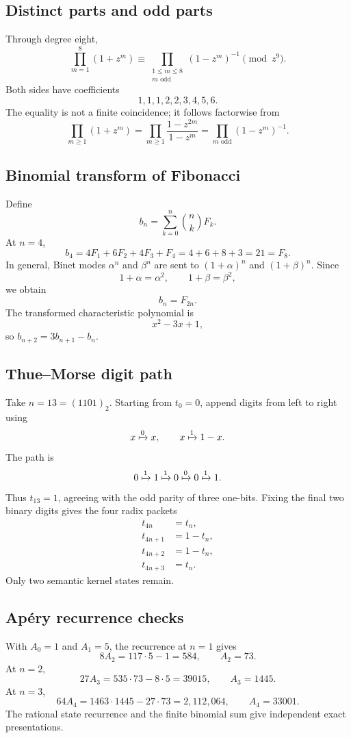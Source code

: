 \documentclass[11pt]{article}
\theoremstyle{definition}\newtheorem{definition}[theorem]{Definition}\newtheorem{example}[theorem]{Example}\newtheorem{construction}[theorem]{Construction}\newtheorem{algorithm}[theorem]{Algorithm}\newtheorem{conjecture}[theorem]{Conjecture}\newtheorem{problem}[theorem]{Problem}
\theoremstyle{remark}\newtheorem{remark}[theorem]{Remark}\newtheorem{boundary}[theorem]{Boundary}\newtheorem{certificate}[theorem]{Computational Certificate}\newtheorem{classical}[theorem]{Classical Input}\newtheorem{principle}[theorem]{Structural Principle}
\begin{document}
\subsection{Distinct parts and odd parts}
Through degree eight,
\[
 \prod_{m=1}^{8}(1+z^m)
 \equiv
 \prod_{\substack{1\leq m\leq8\\m\text{ odd}}}(1-z^m)^{-1}
 \pmod{z^9}.
\]
Both sides have coefficients
\[
 1,1,1,2,2,3,4,5,6.
\]
The equality is not a finite coincidence; it follows factorwise from
\[
 \prod_{m\geq1}(1+z^m)
 =\prod_{m\geq1}\frac{1-z^{2m}}{1-z^m}
 =\prod_{m\text{ odd}}(1-z^m)^{-1}.
\]

\subsection{Binomial transform of Fibonacci}
Define
\[
 b_n=\sum_{k=0}^{n}\binom nkF_k.
\]
At $n=4$,
\[
 b_4=4F_1+6F_2+4F_3+F_4
 =4+6+8+3=21=F_8.
\]
In general, Binet modes $\alpha^n$ and $\beta^n$ are sent to $(1+\alpha)^n$ and $(1+\beta)^n$.  Since
\[
 1+\alpha=\alpha^2,
 \qquad
 1+\beta=\beta^2,
\]
we obtain
\[
 \boxed{b_n=F_{2n}.}
\]
The transformed characteristic polynomial is
\[
 x^2-3x+1,
\]
so $b_{n+2}=3b_{n+1}-b_n$.

\subsection{Thue--Morse digit path}
Take $n=13=(1101)_2$.  Starting from $t_0=0$, append digits from left to right using
\[
 x\xmapsto{0}x,
 \qquad
 x\xmapsto{1}1-x.
\]
The path is
\[
 0\xmapsto{1}1\xmapsto{1}0\xmapsto{0}0\xmapsto{1}1.
\]
Thus $t_{13}=1$, agreeing with the odd parity of three one-bits.  Fixing the final two binary digits gives the four radix packets
\[
\begin{aligned}
 t_{4n}&=t_n,\\
 t_{4n+1}&=1-t_n,\\
 t_{4n+2}&=1-t_n,\\
 t_{4n+3}&=t_n.
\end{aligned}
\]
Only two semantic kernel states remain.

\subsection{Ap\'ery recurrence checks}
With $A_0=1$ and $A_1=5$, the recurrence at $n=1$ gives
\[
 8A_2=117\cdot5-1=584,
 \qquad A_2=73.
\]
At $n=2$,
\[
 27A_3=535\cdot73-8\cdot5=39015,
 \qquad A_3=1445.
\]
At $n=3$,
\[
 64A_4=1463\cdot1445-27\cdot73=2{,}112{,}064,
 \qquad A_4=33001.
\]
The rational state recurrence and the finite binomial sum give independent exact presentations.
\end{document}
